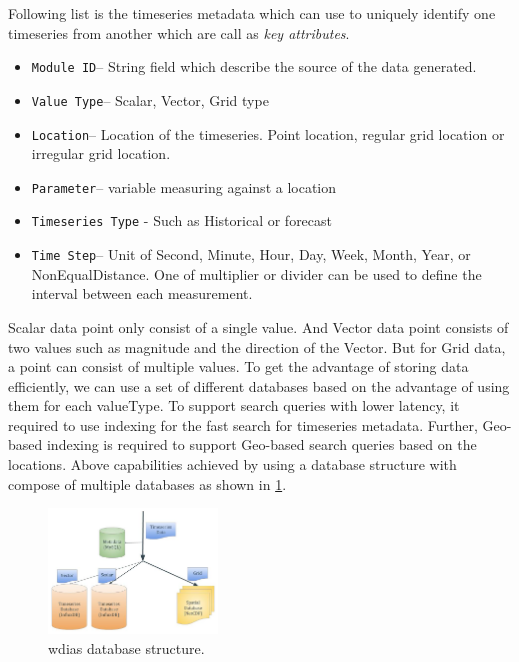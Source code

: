 \documentclass[conference]{IEEEtran}
\begin{document}
Following list is the timeseries metadata which can use to uniquely identify one timeseries from another which are call as \emph{key attributes}.

\begin{itemize}
    \item \texttt{Module ID}--  String field which describe the source of the data generated.
    \item \texttt{Value Type}--  Scalar, Vector, Grid type
    \item \texttt{Location}-- Location of the timeseries. Point location, regular grid location or irregular grid location.
    \item \texttt{Parameter}-- variable measuring against a location
    \item \texttt{Timeseries Type} - Such as Historical or forecast
    \item \texttt{Time Step}-- Unit of Second, Minute, Hour, Day, Week, Month, Year, or NonEqualDistance. One of multiplier or divider can be used to define the interval between each measurement.
\end{itemize}

Scalar data point only consist of a single value. And Vector data point consists of two values such as magnitude and the direction of the Vector. But for Grid data, a point can consist of multiple values. To get the advantage of storing data efficiently, we can use a set of different databases based on the advantage of using them for each valueType. To support search queries with lower latency, it required to use indexing for the fast search for timeseries metadata. Further, Geo-based indexing is required to support Geo-based search queries based on the locations. Above capabilities achieved by using a database structure with compose of multiple databases as shown in \cref{pfi:database_structure}.

\begin{figure}[htbp]
\centerline{\includegraphics[width=0.4\textwidth]{method/microservice/wdias_database_structure.jpg}}
\caption{\acrshort{wdias} database structure.}
\label{pfi:database_structure}
\end{figure}
\end{document}
